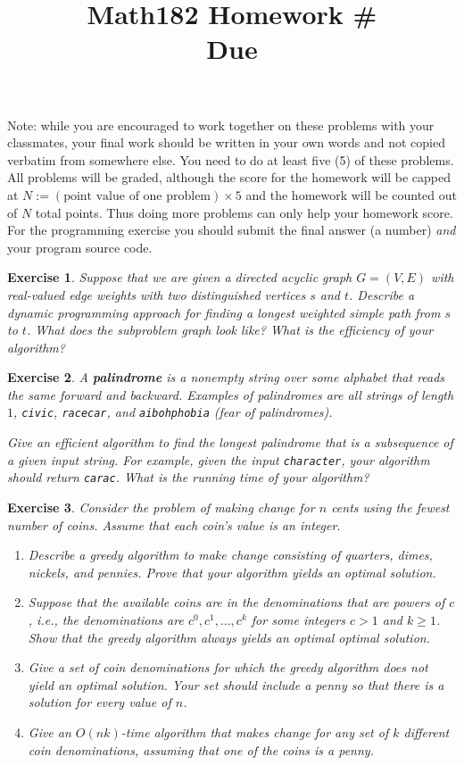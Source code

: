 \documentclass[11pt]{amsart}
\title{Math182 Homework \#\homeworknumber
\\ Due \duedate}
\theoremstyle{theorem}
\newtheorem{exercise}{Exercise}
\begin{document}
\maketitle


Note: while you are encouraged to work together on these problems with your classmates, your final work should be written in your own words and not copied verbatim from somewhere else. You need to do at least five (5) of these problems. All problems will be graded, although the score for the homework will be capped at $N:=(\text{point value of one problem})\times 5$ and the homework will be counted out of $N$ total points. Thus doing more problems can only help your homework score. For the programming exercise you should submit the final answer (a number) \emph{and} your program source code.


\begin{exercise}
Suppose that we are given a directed acyclic graph $G=(V,E)$ with real-valued edge weights with two distinguished vertices $s$ and $t$. Describe a dynamic programming approach for finding a longest weighted simple path from $s$ to $t$. What does the subproblem graph look like? What is the efficiency of your algorithm?
\end{exercise}

\begin{exercise}
A \textbf{palindrome} is a nonempty string over some alphabet that reads the same forward and backward. Examples of palindromes are all strings of length $1$, \texttt{civic}, \texttt{racecar}, and \texttt{aibohphobia} (fear of palindromes).

Give an efficient algorithm to find the longest palindrome that is a subsequence of a given input string. For example, given the input \texttt{character}, your algorithm should return \texttt{carac}. What is the running time of your algorithm?
\end{exercise}


\begin{exercise}
Consider the problem of making change for $n$ cents using the fewest number of coins. Assume that each coin's value is an integer.
\begin{enumerate}
\item Describe a greedy algorithm to make change consisting of quarters, dimes, nickels, and pennies. Prove that your algorithm yields an optimal solution.
\item Suppose that the available coins are in the denominations that are powers of $c$, i.e., the denominations are $c^0, c^1,\ldots,c^k$ for some integers $c>1$ and $k\geq 1$. Show that the greedy algorithm always yields an optimal optimal solution.
\item Give a set of coin denominations for which the greedy algorithm does not yield an optimal solution. Your set should include a penny so that there is a solution for every value of $n$.
\item Give an $O(nk)$-time algorithm that makes change for any set of $k$ different coin denominations, assuming that one of the coins is a penny.
\end{enumerate}
\end{exercise}
\end{document}
